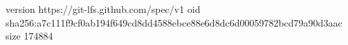 version https://git-lfs.github.com/spec/v1
oid sha256:a7c111f9cf0ab194f649cd8dd4588ebce88e6d8dc6d00059782bcd79a90d3aac
size 174884
